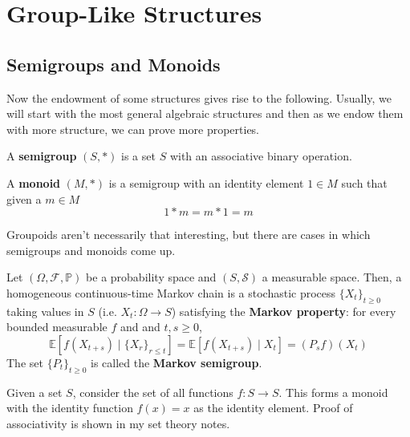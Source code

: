 \section{Group-Like Structures} 

\subsection{Semigroups and Monoids}

  Now the endowment of some structures gives rise to the following. Usually, we will start with the most general algebraic structures and then as we endow them with more structure, we can prove more properties. 

  \begin{definition}[Semigroup]
    A \textbf{semigroup} $(S, *)$ is a set $S$ with an associative binary operation. 
  \end{definition} 

  \begin{definition}[Monoid]
    A \textbf{monoid} $(M, *)$ is a semigroup with an identity element $1 \in M$ such that given a $m \in M$
    \begin{equation}
      1 * m = m * 1 = m
    \end{equation}
  \end{definition}

  Groupoids aren't necessarily that interesting, but there are cases in which semigroups and monoids come up. 

  \begin{example}
    Let $(\Omega, \mathcal{F}, \mathbb{P})$ be a probability space and $(S, \mathcal{S})$ a measurable space. Then, a homogeneous continuous-time Markov chain is a stochastic process $\{X_t\}_{t \geq 0}$ taking values in $S$ (i.e. $X_t: \Omega \rightarrow S$) satisfying the \textbf{Markov property}: for every bounded measurable $f$ and and $t, s \geq 0$, 
    \begin{equation}
      \mathbb{E}[ f(X_{t + s}) \mid \{X_r\}_{r \leq t} ] = \mathbb{E}[ f(X_{t + s}) \mid X_t ] = (P_s f)(X_t)
    \end{equation}
    The set $\{P_t\}_{t \geq 0}$ is called the \textbf{Markov semigroup}. 
  \end{example} 

  \begin{example}
    Given a set $S$, consider the set of all functions $f: S \rightarrow S$. This forms a monoid with the identity function $f(x) = x$ as the identity element. Proof of associativity is shown in my set theory notes. 
  \end{example} 

